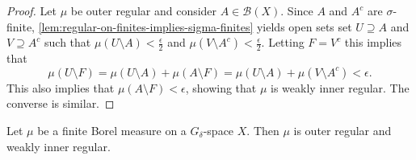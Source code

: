 \documentclass[article, a4paper, 11pt, oneside]{memoir}
\numberwithin{equation}{chapter}
\newcommand{\calB}{\mathcal{B}}
\newcommand{\borel}[1]{\calB(#1)}
\begin{document}
\begin{proof}
    Let $\mu$ be outer regular and consider $A \in \borel{X}$. Since $A$ and $A^c$ are $\sigma$-finite, \cref{lem:regular-on-finites-implies-sigma-finites} yields open sets set $U \supseteq A$ and $V \supseteq A^c$ such that $\mu(U \setminus A) < \tfrac{\epsilon}{2}$ and $\mu(V \setminus A^c) < \tfrac{\epsilon}{2}$. Letting $F = V^c$ this implies that
    \begin{equation*}
        \mu(U \setminus F)
            = \mu(U \setminus A) + \mu(A \setminus F)
            = \mu(U \setminus A) + \mu(V \setminus A^c)
            < \epsilon.
    \end{equation*}
    This also implies that $\mu(A \setminus F) < \epsilon$, showing that $\mu$ is weakly inner regular. The converse is similar.
\end{proof}


\begin{lemma}
    \label{lem:G-delta-regularity}
    Let $\mu$ be a finite Borel measure on a $G_\delta$-space $X$. Then $\mu$ is outer regular and weakly inner regular.
\end{lemma}

\newcommand{\calA}{\mathcal{A}}
\end{document}

